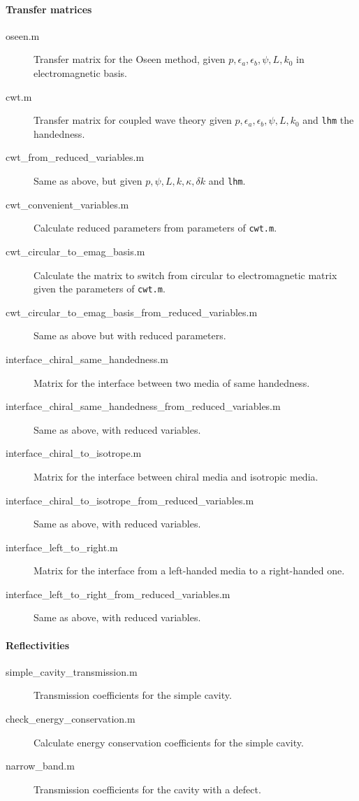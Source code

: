 \paragraph{Transfer matrices}

\begin{description}
	\item[oseen.m] Transfer matrix for the Oseen method, given $p, \epsilon_a, \epsilon_b, \psi, L, k_0$ in electromagnetic basis.
	\item[cwt.m] Transfer matrix for coupled wave theory given $p, \epsilon_a, \epsilon_b, \psi, L, k_0$ and \verb|lhm| the handedness.
	\item[cwt\_from\_reduced\_variables.m] Same as above, but given $p, \psi, L, k, \kappa, \delta k$ and \verb|lhm|.
	\item[cwt\_convenient\_variables.m] Calculate reduced parameters from parameters of \verb|cwt.m|.
	\item[cwt\_circular\_to\_emag\_basis.m] Calculate the matrix to switch from circular to electromagnetic matrix given the parameters of \verb|cwt.m|.
	\item[cwt\_circular\_to\_emag\_basis\_from\_reduced\_variables.m] Same as above but with reduced parameters.
	\item[interface\_chiral\_same\_handedness.m] Matrix for the interface between two media of same handedness.
	\item[interface\_chiral\_same\_handedness\_from\_reduced\_variables.m] Same as above, with reduced variables.
	\item[interface\_chiral\_to\_isotrope.m] Matrix for the interface between chiral media and isotropic media.
	\item[interface\_chiral\_to\_isotrope\_from\_reduced\_variables.m] Same as above, with reduced variables.
	\item[interface\_left\_to\_right.m] Matrix for the interface from a left-handed media to a right-handed one.
	\item[interface\_left\_to\_right\_from\_reduced\_variables.m] Same as above, with reduced variables.
\end{description}

\paragraph{Reflectivities}

\begin{description}
	\item[simple\_cavity\_transmission.m] Transmission coefficients for the simple cavity.
	\item[check\_energy\_conservation.m] Calculate energy conservation coefficients for the simple cavity.
	\item[narrow\_band.m] Transmission coefficients for the cavity with a defect.
\end{description}


